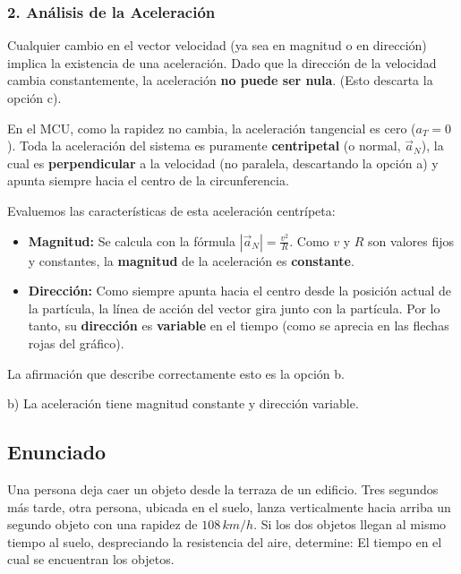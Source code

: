 \documentclass[12pt, a4paper]{article}
\begin{document}
\subsubsection*{2. Análisis de la Aceleración}
Cualquier cambio en el vector velocidad (ya sea en magnitud o en dirección) implica la existencia de una aceleración. Dado que la dirección de la velocidad cambia constantemente, la aceleración \textbf{no puede ser nula}. (Esto descarta la opción c).

En el MCU, como la rapidez no cambia, la aceleración tangencial es cero ($a_T = 0$). Toda la aceleración del sistema es puramente \textbf{centripetal} (o normal, $\vec{a}_N$), la cual es \textbf{perpendicular} a la velocidad (no paralela, descartando la opción a) y apunta siempre hacia el centro de la circunferencia.

Evaluemos las características de esta aceleración centrípeta:
\begin{itemize}
    \item \textbf{Magnitud:} Se calcula con la fórmula $|\vec{a}_N| = \frac{v^2}{R}$. Como $v$ y $R$ son valores fijos y constantes, la \textbf{magnitud} de la aceleración es \textbf{constante}.
    \item \textbf{Dirección:} Como siempre apunta hacia el centro desde la posición actual de la partícula, la línea de acción del vector gira junto con la partícula. Por lo tanto, su \textbf{dirección} es \textbf{variable} en el tiempo (como se aprecia en las flechas rojas del gráfico).
\end{itemize}

La afirmación que describe correctamente esto es la opción b.

\begin{tcolorbox}[colback=green!5!white, colframe=green!50!black, title=Respuesta Final]
\centering \Large b) La aceleración tiene magnitud constante y dirección variable.
\end{tcolorbox}

\newpage

\subsection*{Enunciado}
Una persona deja caer un objeto desde la terraza de un edificio. Tres segundos más tarde, otra persona, ubicada en el suelo, lanza verticalmente hacia arriba un segundo objeto con una rapidez de $108 \, \si{km/h}$. Si los dos objetos llegan al mismo tiempo al suelo, despreciando la resistencia del aire, determine: El tiempo en el cual se encuentran los objetos.
    
\end{document}
